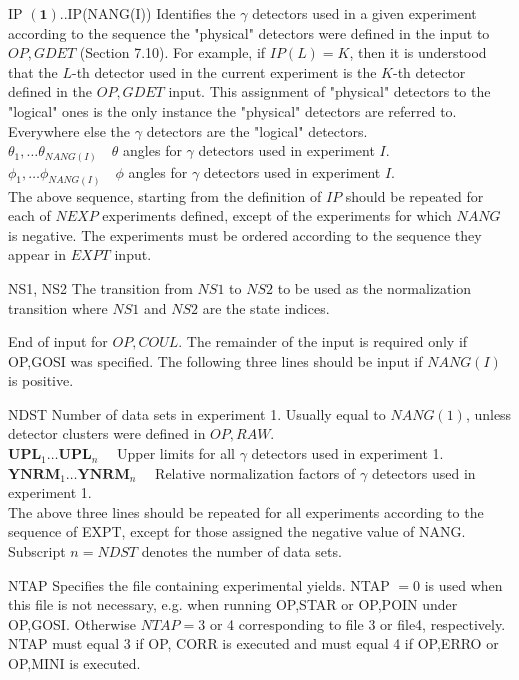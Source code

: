 \documentclass[10pt]{article}
\begin{document}
IP $(\mathbf{1})$..IP(NANG(I)) Identifies the $\gamma$ detectors used in a given experiment according to the sequence the "physical" detectors were defined in the input to $O P, G D E T$ (Section 7.10). For example, if $I P(L)=K$, then it is understood that the $L$-th detector used in the current experiment is the $K$-th detector defined in the $O P, G D E T$ input. This assignment of "physical" detectors to the "logical" ones is the only instance the "physical" detectors are referred to. Everywhere else the $\gamma$ detectors are the "logical" detectors.\\
$\theta_{1}, \ldots \theta_{N A N G(I)} \quad \theta$ angles for $\gamma$ detectors used in experiment $I$.\\
$\phi_{1}, \ldots \phi_{N A N G(I)} \quad \phi$ angles for $\gamma$ detectors used in experiment $I$.\\
The above sequence, starting from the definition of $I P$ should be repeated for each of $N E X P$ experiments defined, except of the experiments for which $N A N G$ is negative. The experiments must be ordered according to the sequence they appear in $E X P T$ input.

NS1, NS2 The transition from $N S 1$ to $N S 2$ to be used as the normalization transition where $N S 1$ and $N S 2$ are the state indices.

End of input for $O P, C O U L$. The remainder of the input is required only if OP,GOSI was specified. The following three lines should be input if $N A N G(I)$ is positive.

NDST Number of data sets in experiment 1. Usually equal to $N A N G(1)$, unless detector clusters were defined in $O P, R A W$.\\
$\mathbf{U P L}_{1} \ldots \mathbf{U P L}_{n} \quad$ Upper limits for all $\gamma$ detectors used in experiment 1.\\
$\mathbf{Y N R M}_{1} \ldots \mathbf{Y N R M}_{n} \quad$ Relative normalization factors of $\gamma$ detectors used in experiment 1.\\
The above three lines should be repeated for all experiments according to the sequence of EXPT, except for those assigned the negative value of NANG. Subscript $n=N D S T$ denotes the number of data sets.

NTAP Specifies the file containing experimental yields. NTAP $=0$ is used when this file is not necessary, e.g. when running OP,STAR or OP,POIN under OP,GOSI. Otherwise $N T A P=3$ or 4 corresponding to file 3 or file4, respectively. NTAP must equal 3 if OP, CORR is executed and must equal 4 if OP,ERRO or OP,MINI is executed.
\end{document}
